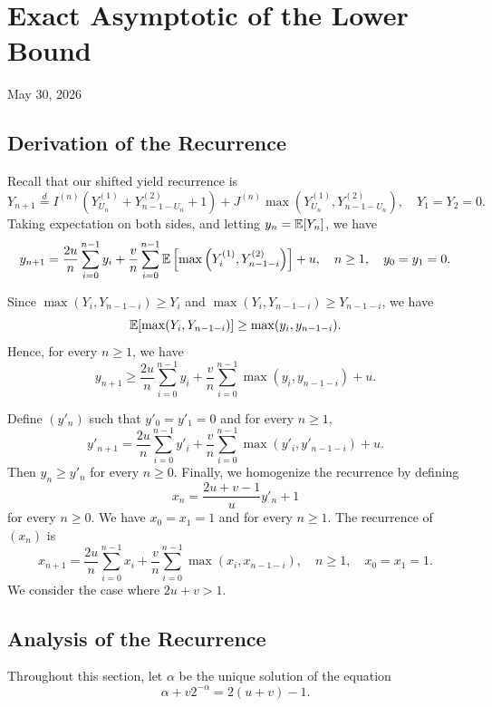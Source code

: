 \chapter{Exact Asymptotic of the Lower Bound}
\begin{center}
  May 30, 2026
  \vspace{0.5cm}
\end{center}

\section{Derivation of the Recurrence}

Recall that our shifted yield recurrence is
$$Y_{n+1} \stackrel{d}{=} I^{(n)}\left(Y_{U_n}^{(1)} + Y_{n-1-U_n}^{(2)} + 1\right) + J^{(n)}\max\left(Y_{U_n}^{(1)}, Y_{n-1-U_n}^{(2)}\right), \quad Y_1=Y_2=0.$$
Taking expectation on both sides, and letting $y_n=\mathbb{E}[Y_n]$, we have
$$y_{n+1} = \dfrac{2u}{n}\sum_{i=0}^{n-1}y_i + \dfrac{v}{n}\sum_{i=0}^{n-1}\mathbb{E}\left[\max\left(Y_{i}^{(1)}, Y_{n-1-i}^{(2)}\right)\right]+u, \quad n\ge 1, \quad y_0=y_1=0.$$

Since $\max(Y_i, Y_{n-1-i}) \ge Y_i$ and $\max(Y_i, Y_{n-1-i}) \ge Y_{n-1-i}$, we have
$$\mathbb{E}[\max(Y_i, Y_{n-1-i})] \ge \max(y_i, y_{n-1-i}).$$
Hence, for every $n\ge 1$, we have
$$y_{n+1} \ge \dfrac{2u}{n}\sum_{i=0}^{n-1}y_i + \dfrac{v}{n}\sum_{i=0}^{n-1}\max(y_{i}, y_{n-1-i})+u.$$

Define $(y'_n)$ such that $y'_0=y'_1=0$ and for every $n\ge 1$,
$$y'_{n+1} = \dfrac{2u}{n}\sum_{i=0}^{n-1}y'_i + \dfrac{v}{n}\sum_{i=0}^{n-1}\max(y'_{i}, y'_{n-1-i})+u.$$
Then $y_n \ge y'_n$ for every $n\ge 0$. Finally, we homogenize the recurrence by defining
$$x_n = \dfrac{2u+v-1}{u}y'_n + 1$$
for every $n\ge 0$. We have $x_0=x_1=1$ and for every $n\ge 1$. The recurrence of $(x_n)$ is
\begin{equation}
  \label{eq:recurrence-sum-diff}
  x_{n+1} = \dfrac{2u}{n}\sum_{i=0}^{n-1}x_i + \dfrac{v}{n}\sum_{i=0}^{n-1}\max(x_{i}, x_{n-1-i}), \quad n \ge 1, \quad  x_0=x_1=1.
\end{equation}
We consider the case where $2u+v>1$.

\section{Analysis of the Recurrence}

Throughout this section, let $\alpha$ be the unique solution of the equation
\begin{equation}
  \alpha + v2^{-\alpha} = 2(u+v)-1.
\end{equation}

